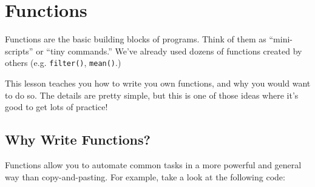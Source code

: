\documentclass[]{book}
\begin{document}
\hypertarget{functions-1}{%
\section{Functions}\label{functions-1}}

Functions are the basic building blocks of programs. Think of them as ``mini-scripts'' or ``tiny commands.'' We've already used dozens of functions created by others (e.g. \texttt{filter()}, \texttt{mean()}.)

This lesson teaches you how to write you own functions, and why you would want to do so. The details are pretty simple, but this is one of those ideas where it's good to get lots of practice!

\hypertarget{why-write-functions}{%
\subsection{Why Write Functions?}\label{why-write-functions}}

Functions allow you to automate common tasks in a more powerful and general way than copy-and-pasting. For example, take a look at the following code:
\end{document}
